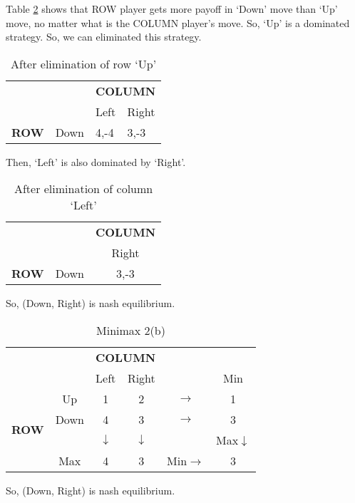 \documentclass[a4paper,12pt]{article}
\begin{document}
\begin{enumerate}
\begin{enumerate}
Table \ref{tab:completeb} shows that ROW player gets more payoff in `Down' move than `Up' move, no matter what is the COLUMN player's move. So, `Up' is a dominated strategy. So, we can eliminated this strategy.

\begin{table}[H]
\centering
\begin{tabular}{@{}llll@{}}
\toprule
& & \multicolumn{2}{c}{\bfseries COLUMN}\\
& & Left & Right\\
{\bfseries ROW} & Down & 4,-4 & 3,-3\\
\bottomrule
\end{tabular}
\caption{After elimination of row `Up'}
\label{tab:completeb}
\end{table}

Then, `Left' is also dominated by `Right'.
\begin{table}[H]
\centering
\begin{tabular}{@{}ccc@{}}
\toprule
& & {\bfseries COLUMN}\\
& & Right\\
{\bfseries ROW} & Down & 3,-3\\
\bottomrule
\end{tabular}
\caption{After elimination of column `Left'}
\label{tab:completeb}
\end{table}

So, (Down, Right) is nash equilibrium.

\begin{table}[H]
\centering
\begin{tabular}{@{}cccccc@{}}
\toprule
& & \multicolumn{2}{c}{\bfseries COLUMN}\\
& & Left & Right && Min\\
\multirow{4}{*}{\bfseries ROW} & Up & 1 & 2 &$\rightarrow$& 1\\
 & Down & 4 & \cellcolor{gray}3 &$\rightarrow$& 3\\
 & & $\downarrow$ & $\downarrow$ & & Max$\downarrow$\\
 & Max & 4 & 3&Min$\rightarrow$&3\\
\bottomrule
\end{tabular}
\caption{Minimax 2(b)}
\end{table}

So, (Down, Right) is nash equilibrium.


\end{enumerate}
\end{enumerate}
\end{document}
